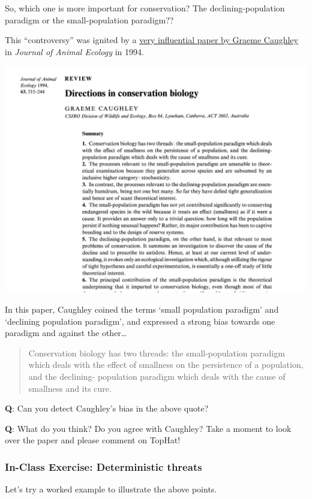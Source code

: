 \documentclass[
]{article}
\begin{document}
So, which one is more important for conservation? The
declining-population paradigm or the small-population paradigm??

This ``controversy'' was ignited by a \href{caughley1.pdf}{very
influential paper by Graeme Caughley} in \emph{Journal of Animal
Ecology} in 1994.

\includegraphics{caughley1.jpg}

In this paper, Caughley coined the terms `small population paradigm' and
`declining population paradigm', and expressed a strong bias towards one
paradigm and against the other\ldots{}

\begin{quote}
Conservation biology has two threads: the small-population paradigm
which deals with the effect of smallness on the persistence of a
population, and the declining- population paradigm which deals with the
cause of smallness and its cure.
\end{quote}

\textbf{Q}: Can you detect Caughley's bias in the above quote?

\textbf{Q}: What do you think? Do you agree with Caughley? Take a moment
to look over the paper and please comment on TopHat!

\hypertarget{in-class-exercise-deterministic-threats}{%
\subsubsection{In-Class Exercise: Deterministic
threats}\label{in-class-exercise-deterministic-threats}}

Let's try a worked example to illustrate the above points.
\end{document}
